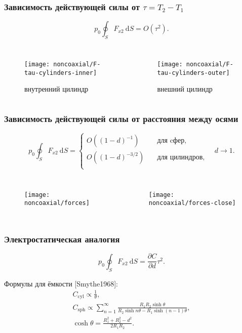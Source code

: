 \documentclass[mathserif]{beamer} %
\newcommand{\dd}{\:\mathrm{d}}
\newcommand{\pder}[2][]{\frac{\partial#1}{\partial#2}}
\newcommand{\OO}[1]{O(#1)}
\begin{document}
\begin{frame}
    \frametitle{Зависимость действующей силы от \(\tau = T_2-T_1\)}
    \vspace{-.2cm}
    \[ p_0 \oint_S F_{x2}\dd{S} = \OO{\tau^2}. \]
    \vspace{-.7cm}
    \begin{columns}
        \begin{figure}
            \texttt{[image: noncoaxial/F-tau-cylinders-inner]}
            \vspace{-.5cm}\caption{внутренний цилиндр}
        \end{figure}
        \begin{figure}
            \texttt{[image: noncoaxial/F-tau-cylinders-outer]}
            \vspace{-.5cm}\caption{внешний цилиндр}
        \end{figure}
    \end{columns}
\end{frame}

\begin{frame}
    \frametitle{Зависимость действующей силы от расстояния между осями}
    \vspace{-.5cm}
    \[ p_0 \oint_S F_{x2}\dd{S} = \begin{cases}
        \OO{(1-d)^{-1}} & \quad\text{для cфер}, \\
        \OO{(1-d)^{-3/2}} & \quad\text{для цилиндров}, \\
        \end{cases} \quad d\to1. \]
    \vspace{-.7cm}
    \begin{columns}
        \begin{figure}
            \texttt{[image: noncoaxial/forces]}
        \end{figure}
        \begin{figure}
            \texttt{[image: noncoaxial/forces-close]}
        \end{figure}
    \end{columns}
\end{frame}

\begin{frame}
    \frametitle{Электростатическая аналогия}
    \begin{equation}
        p_0\oint_S F_{x2}\dd{S} = \pder[C]{d} \tau^2.
    \end{equation}
    \pause
    \vspace{10pt}

    Формулы для ёмкости [Smythe1968]:
    \begin{gather}
        C_\mathrm{cyl} \propto \frac1{\theta}, \\
        C_\mathrm{sph} \propto  \sum_{n=1}^\infty \frac{R_1 R_2 \sinh\theta} {R_2\sinh n\theta - R_1\sinh (n-1)\theta}, \\
        \cosh\theta = \frac{R_1^2 + R_2^2 - d^2}{2 R_1 R_2}.
    \end{gather}
\end{frame}
\end{document}
